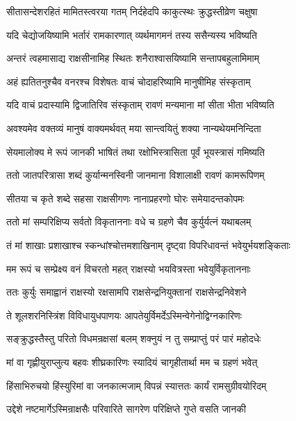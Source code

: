 \twolineshloka
{सीतासन्देशरहितं मामितस्त्वरया गतम्}
{निर्दहेदपि काकुत्स्थः क्रुद्धस्तीव्रेण चक्षुषा} %

\twolineshloka
{यदि चेद्योजयिष्यामि भर्तारं रामकारणात्}
{व्यर्थमागमनं तस्य ससैन्यस्य भविष्यति} %

\twolineshloka
{अन्तरं त्वहमासाद्य राक्षसीनामिह स्थितः}
{शनैराश्वासयिष्यामि सन्तापबहुलामिमाम्} %

\twolineshloka
{अहं ह्यतितनुश्चैव वनरश्च विशेषतः}
{वाचं चोदाहरिष्यामि मानुषीमिह संस्कृताम्} %

\twolineshloka
{यदि वाचं प्रदास्यामि द्विजातिरिव संस्कृताम्}
{रावणं मन्यमाना मां सीता भीता भविष्यति} %

\twolineshloka
{अवश्यमेव वक्तव्यं मानुषं वाक्यमर्थवत्}
{मया सान्त्वयितुं शक्या नान्यथेयमनिन्दिता} %

\twolineshloka
{सेयमालोक्य मे रूपं जानकी भाषितं तथा}
{रक्षोभिस्त्रासिता पूर्वं भूयस्त्रासं गमिष्यति} %

\twolineshloka
{ततो जातपरित्रासा शब्दं कुर्यान्मनस्विनी}
{जानमाना विशालाक्षी रावणं कामरूपिणम्} %

\twolineshloka
{सीतया च कृते शब्दे सहसा राक्षसीगणः}
{नानाप्रहरणो घोरः समेयादन्तकोपमः} %

\twolineshloka
{ततो मां सम्परिक्षिप्य सर्वतो विकृताननाः}
{वधे च ग्रहणे चैव कुर्युर्यत्नं यथाबलम्} %

\twolineshloka
{तं मां शाखाः प्रशाखाश्च स्कन्धांश्चोत्तमशाखिनाम्}
{दृष्ट्वा विपरिधावन्तं भवेयुर्भयशङ्किताः} %

\twolineshloka
{मम रूपं च सम्प्रेक्ष्य वनं विचरतो महत्}
{राक्षस्यो भयवित्रस्ता भवेयुर्विकृताननाः} %

\twolineshloka
{ततः कुर्युः समाह्वानं राक्षस्यो रक्षसामपि}
{राक्षसेन्द्रनियुक्तानां राक्षसेन्द्रनिवेशने} %

\twolineshloka
{ते शूलशरनिस्त्रिंश विविधायुधपाणयः}
{आपतेयुर्विमर्देऽस्मिन्वेगेनोद्विग्नकारिणः} %

\twolineshloka
{सङ्क्रुद्धस्तैस्तु परितो विधमन्रक्षसां बलम्}
{शक्नुयं न तु सम्प्राप्तुं परं पारं महोदधेः} %

\twolineshloka
{मां वा गृह्णीयुराप्लुत्य बहवः शीघ्रकारिणः}
{स्यादियं चागृहीतार्था मम च ग्रहणं भवेत्} %

\twolineshloka
{हिंसाभिरुचयो हिंस्युरिमां वा जनकात्मजाम्}
{विपन्नं स्यात्ततः कार्यं रामसुग्रीवयोरिदम्} %

\twolineshloka
{उद्देशे नष्टमार्गेऽस्मिन्राक्षसैः परिवारिते}
{सागरेण परिक्षिप्ते गुप्ते वसति जानकी} %


